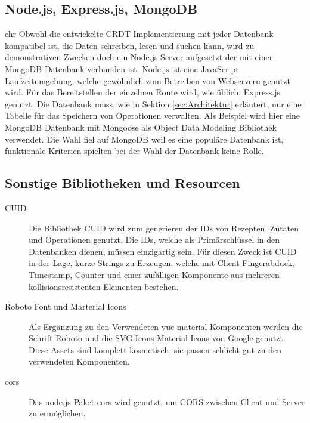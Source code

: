 \documentclass[a4paper, 12pt]{scrreprt}
\begin{document}
\begin{minipage}{\linewidth}
	
\end{minipage}

\begin{minipage}{\linewidth}
	
\end{minipage}

\subsection{Node.js, Express.js, MongoDB}
chr
Obwohl die entwickelte CRDT Implementierung mit jeder Datenbank kompatibel ist, die Daten schreiben, lesen und suchen kann, wird zu demonstrativen Zwecken doch ein Node.js Server aufgesetzt der mit einer MongoDB Datenbank verbunden ist. Node.js ist eine JavaScript Laufzeitumgebung, welche gewöhnlich zum Betreiben von Webservern genutzt wird. Für das Bereitstellen der einzelnen Route wird, wie üblich, Express.js genutzt. Die Datenbank muss, wie in Sektion \ref{sec:Architektur} erläutert, nur eine Tabelle für das Speichern von Operationen verwalten. Als Beispiel wird hier eine MongoDB Datenbank mit Mongoose als Object Data Modeling Bibliothek verwendet. Die Wahl fiel auf MongoDB weil es eine populäre Datenbank ist, funktionale Kriterien spielten bei der Wahl der Datenbank keine Rolle. 

\subsection{Sonstige Bibliotheken und Resourcen}

\begin{description}
	\item[CUID] Die Bibliothek CUID wird zum generieren der IDs von Rezepten, Zutaten und Operationen genutzt. Die IDs, welche als Primärschlüssel in den Datenbanken dienen, müssen einzigartig sein. Für diesen Zweck ist CUID in der Lage, kurze Strings zu Erzeugen, welche mit Client-Fingerabduck, Timestamp, Counter und einer zufälligen Komponente aus mehreren kollisionsresistenten Elementen bestehen.
	\item[Roboto Font und Marterial Icons] Als Ergänzung zu den Verwendeten vue-material Komponenten werden die Schrift Roboto und die SVG-Icons Material Icons von Google genutzt. Diese Assets sind komplett kosmetisch, sie passen schlicht gut zu den verwendeten Komponenten.
	\item[cors] Das node.js Paket cors wird genutzt, um \ac{CORS} zwischen Client und Server zu ermöglichen.
\end{description}
\end{document}
